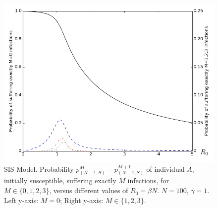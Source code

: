 \documentclass[preprint,12pt]{elsarticle}
\begin{document}
\begin{figure}[h!]
  \centering
 \includegraphics[width=\textwidth]{SIS_Homogeneous.jpg}
 \caption{SIS Model. Probability $p_{(N-1,S)}^M-p_{(N-1,S)}^{M+1}$ of individual $A$, initially susceptible, suffering exactly $M$ infections, for $M\in\{0,1,2,3\}$, versus different values of $R_0=\beta N$. $N=100$, $\gamma=1$. Left y-axis: $M=0$; Right y-axis: $M\in\{1,2,3\}$.}
  \label{fig:sis_homogeneous}
\end{figure}
\end{document}
